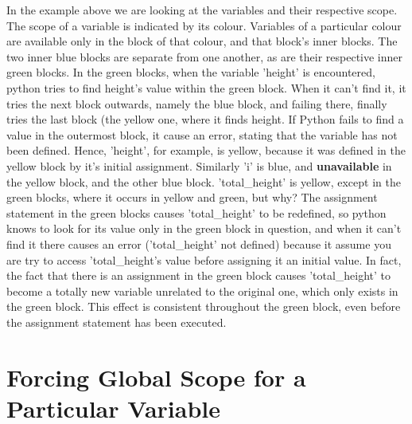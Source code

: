 In the example above we are looking at the variables and their   respective scope. The scope of a variable is indicated by its colour.   Variables of a particular colour are available only in the block of   that colour, and that block's inner blocks. The two inner blue blocks   are separate from one another, as are their respective inner green   blocks. In the green blocks, when the variable 'height' is encountered,   python tries to find height's value within the green block. When it   can't find it, it tries the next block outwards, namely the blue block,   and failing there, finally tries the last block (the yellow one, where   it finds height. If Python fails to find a value in the outermost   block, it cause an error, stating that the variable has not been   defined.  Hence, 'height', for example, is yellow, because it was   defined in the yellow block by it's initial assignment. Similarly 'i'   is blue, and \textbf{unavailable} in the yellow block, and the   other blue block. 'total\_height' is yellow, except in the green blocks,   where it occurs in yellow and green, but why? The assignment statement   in the green blocks causes 'total\_height' to be redefined, so python   knows to look for its value only in the green block in question, and   when it can't find it there causes an error ('total\_height' not   defined) because it assume you are try to access 'total\_height's value   before assigning it an initial value. In fact, the fact that there is an   assignment in the green block causes 'total\_height' to become a totally   new variable unrelated to the original one, which only exists in the   green block.  This effect is consistent throughout the green block,   even before the assignment statement has been executed.

\section{Forcing Global Scope for a Particular Variable}

